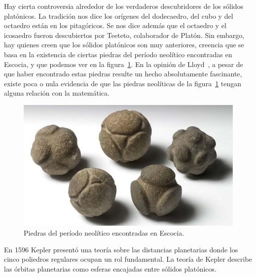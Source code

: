 Hay cierta controversia alrededor de los verdaderos descubridores de los
sólidos platónicos. La tradición nos dice los orígenes del dodecaedro, del cubo
y del octaedro están en los pitagóricos. Se nos dice además que el octaedro y
el icosaedro fueron descubiertos por Teeteto, colaborador de Platón. Sin
embargo, hay quienes creen que los sólidos platónicos son muy anteriores,
creencia que se basa en la existencia de ciertas piedras del período neolítico
encontradas en Escocia, y que podemos ver en la figura~\ref{fig:piedras}. En la
opinión de Lloyd~\cite{MR2992714}, a pesar de que haber encontrado estas piedras resulte
un hecho absolutamente fascinante, existe poca o nula evidencia de que las piedras neolíticas de la
figura~\ref{fig:piedras} tengan alguna relación con la matemática. 
 
\begin{figure}
   \centering
   \includegraphics[scale=0.1]{images/stones}
   \caption{Piedras del período neolítico encontradas en Escocia.}
   \label{fig:piedras}
\end{figure}



En 1596 Kepler presentó una teoría sobre las distancias planetarias donde los
cinco poliedros regulares ocupan un rol fundamental. La teoría
de Kepler describe las órbitas planetarias como esferas encajadas
entre sólidos platónicos. 

